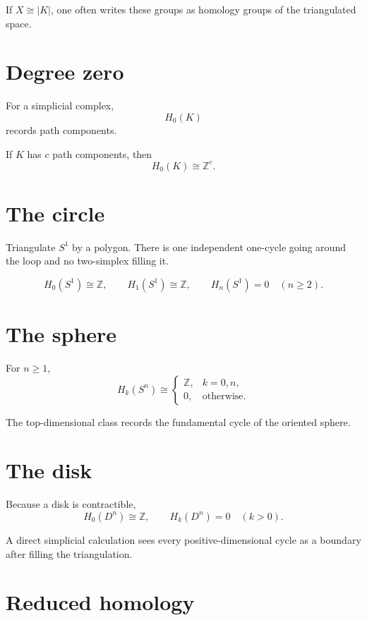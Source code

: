 If \(X\cong|K|\), one often writes these groups as homology groups of the
triangulated space.

\section{Degree zero}

For a simplicial complex,
\[
H_0(K)
\]
records path components.

\begin{theorem}
\label{thm:viii17-h0}
If \(K\) has \(c\) path components, then
\[
H_0(K)\cong\mathbb Z^c.
\]
\end{theorem}

\section{The circle}

Triangulate \(S^1\) by a polygon.  There is one independent one-cycle going
around the loop and no two-simplex filling it.

\begin{theorem}
\label{thm:viii17-circle}
\[
H_0(S^1)\cong\mathbb Z,
\qquad
H_1(S^1)\cong\mathbb Z,
\qquad
H_n(S^1)=0\quad(n\ge2).
\]
\end{theorem}

\section{The sphere}

For \(n\ge1\),
\[
H_k(S^n)\cong
\begin{cases}
\mathbb Z,&k=0,n,\\
0,&\text{otherwise}.
\end{cases}
\]

The top-dimensional class records the fundamental cycle of the oriented
sphere.

\section{The disk}

Because a disk is contractible,
\[
H_0(D^n)\cong\mathbb Z,
\qquad
H_k(D^n)=0\quad(k>0).
\]

A direct simplicial calculation sees every positive-dimensional cycle as a
boundary after filling the triangulation.

\section{Reduced homology}

